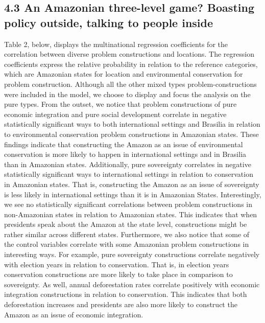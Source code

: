 \documentclass[
]{article}
\begin{document}
\hypertarget{an-amazonian-three-level-game-boasting-policy-outside-talking-to-people-inside}{%
\subsection{4.3 An Amazonian three-level game? Boasting policy outside,
talking to people
inside}\label{an-amazonian-three-level-game-boasting-policy-outside-talking-to-people-inside}}

Table 2, below, displays the multinational regression coefficients for
the correlation between diverse problem constructions and locations. The
regression coefficients express the relative probability in relation to
the reference categories, which are Amazonian states for location and
environmental conservation for problem construction. Although all the
other mixed types problem-constructions were included in the model, we
choose to display and focus the analysis on the pure types. From the
outset, we notice that problem constructions of pure economic
integration and pure social development correlate in negative
statistically significant ways to both international settings and
Brasilia in relation to environmental conservation problem constructions
in Amazonian states. These findings indicate that constructing the
Amazon as an issue of environmental conservation is more likely to
happen in international settings and in Brasilia than in Amazonian
states. Additionally, pure sovereignty correlates in negative
statistically significant ways to international settings in relation to
conservation in Amazonian states. That is, constructing the Amazon as an
issue of sovereignty is less likely in international settings than it is
in Amazonian States. Interestingly, we see no statistically significant
correlations between problem constructions in non-Amazonian states in
relation to Amazonian states. This indicates that when presidents speak
about the Amazon at the state level, constructions might be rather
similar across different states. Furthermore, we also notice that some
of the control variables correlate with some Amazonian problem
constructions in interesting ways. For example, pure sovereignty
constructions correlate negatively with election years in relation to
conservation. That is, in election years conservation constructions are
more likely to take place in comparison to sovereignty. As well, annual
deforestation rates correlate positively with economic integration
constructions in relation to conservation. This indicates that both
deforestation increases and presidents are also more likely to construct
the Amazon as an issue of economic integration.
\end{document}
